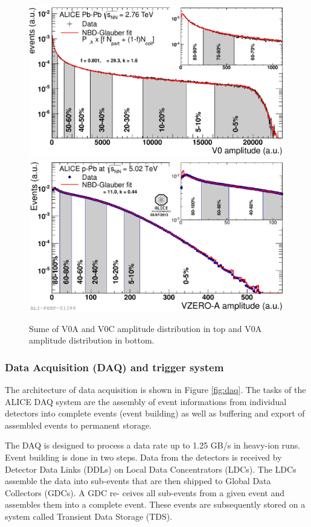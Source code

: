 \begin{figure}[htbp]
\begin{center}
\includegraphics[width=12.cm]{./Version1/FigChapter4/CentralityPbPb}
\hspace{1.0cm}
\includegraphics[width=12.cm]{./Version1/FigChapter4/CentralitypPb}
\caption{ Sume of V0A and V0C amplitude distribution in top and V0A amplitude distribution in bottom.}
\label{fig:centralityestimate}
\end{center}
\end{figure}

\newpage
\subsubsection{Data Acquisition (DAQ) and trigger system}\label{label:aliceDAQ}
The architecture of data acquisition is shown in Figure \ref{fig:daq}. The tasks of the ALICE DAQ system are the assembly of event informations from individual detectors into complete events (event building) as well as buffering and export of assembled events to permanent storage. 

The DAQ is designed to process a data rate up to 1.25 GB/s in heavy-ion runs. Event building is done in two steps. Data from the detectors is received by Detector Data Links (DDLs) on Local Data Concentrators (LDCs). The LDCs assemble the data into sub-events that are then shipped to Global Data Collectors (GDCs). A GDC re- ceives all sub-events from a given event and assembles them into a complete event. These events are subsequently stored on a system called Transient Data Storage (TDS).

